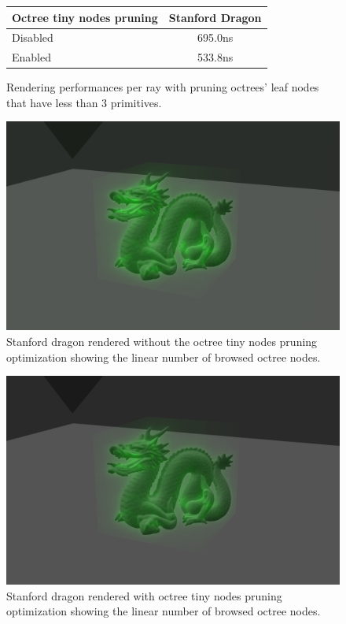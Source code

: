 \documentclass[10pt,twocolumn,a4paper]{article}
\begin{document}
\begin{figure}[H]
    \tiny
    \centering
    \begin{tabular}{ | l | c | }
        \hline
        Octree tiny nodes pruning & Stanford Dragon \\
        \hline
        Disabled & 695.0ns \\
        Enabled & 533.8ns \\
        \hline
    \end{tabular}
    \caption{
        Rendering performances per ray with pruning octrees' leaf nodes that
        have less than 3 primitives.
    }
    \label{table:octree_tiny_node_pruning}
\end{figure}

\begin{figure}[h]
    \centering
    \includegraphics[width=0.8\columnwidth]{stats_octree_nodes.png}
    \caption{
        Stanford dragon rendered without the octree tiny nodes pruning optimization
        showing the linear number of browsed octree nodes.
    }
    \label{fig:stanford_dragon_without_node_pruning}
\end{figure}

\begin{figure}[h]
    \centering
    \includegraphics[width=0.8\columnwidth]{stats_octree_nodes_optimized.png}
    \caption{
        Stanford dragon rendered with octree tiny nodes pruning optimization
        showing the linear number of browsed octree nodes.
    }
    \label{fig:stanford_dragon_with_node_pruning}
\end{figure}
\end{document}
